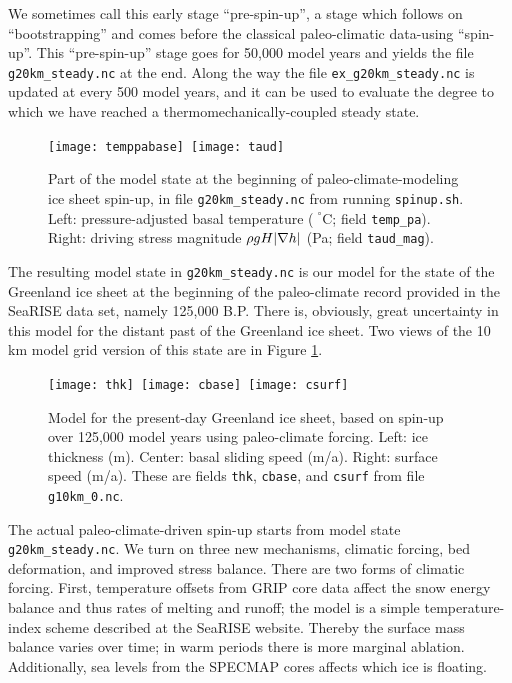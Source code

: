 We sometimes call this early stage ``pre-spin-up'', a stage which follows on ``bootstrapping'' and comes before the classical paleo-climatic data-using ``spin-up''.  This ``pre-spin-up'' stage goes for 50,000 model years and yields the file \texttt{g20km_steady.nc} at the end.  Along the way the file \texttt{ex_g20km_steady.nc} is updated at every 500 model years, and it can be used to evaluate the degree to which we have reached a thermomechanically-coupled steady state.


\begin{figure}[ht]
\centering
\mbox{\texttt{[image: temppabase]}
  \qquad \texttt{[image: taud]}}
\caption{Part of the model state at the beginning of paleo-climate-modeling ice sheet spin-up, in file \texttt{g20km_steady.nc} from running \texttt{spinup.sh}.  Left: pressure-adjusted basal temperature ($\phantom{|}^\circ$C; field \texttt{temp_pa}).  Right: driving stress magnitude $\rho g H |\nabla h|$ (Pa; field \texttt{taud_mag}).}
\label{fig:sr-spinstart}
\end{figure}

The resulting model state in \texttt{g20km_steady.nc} is our model for the state of the Greenland ice sheet at the beginning of the paleo-climate record provided in the SeaRISE data set, namely 125,000 B.P.  There is, obviously, great uncertainty in this model for the distant past of the Greenland ice sheet.  Two views of the 10\,km model grid version of this state are in Figure \ref{fig:sr-spinstart}.

\begin{figure}[ht]
\centering
\mbox{\texttt{[image: thk]}
  \qquad \texttt{[image: cbase]}
  \qquad \texttt{[image: csurf]}}
\caption{Model for the present-day Greenland ice sheet, based on spin-up over 125,000 model years using paleo-climate forcing.  Left: ice thickness (m).  Center: basal sliding speed (m/a).  Right: surface speed (m/a).  These are fields \texttt{thk}, \texttt{cbase}, and \texttt{csurf} from file \texttt{g10km_0.nc}.}
\label{fig:sr-spindone-map}
\end{figure}

The actual paleo-climate-driven spin-up starts from model state \texttt{g20km_steady.nc}.  We turn on three new mechanisms, climatic forcing, bed deformation, and improved stress balance.  There are two forms of climatic forcing. First, temperature offsets from GRIP core data affect the snow energy balance and thus rates of melting and runoff; the model is a simple temperature-index scheme described at the SeaRISE website.  Thereby the surface mass balance varies over time; in warm periods there is more marginal ablation.  Additionally, sea levels from the SPECMAP cores affects which ice is floating.

